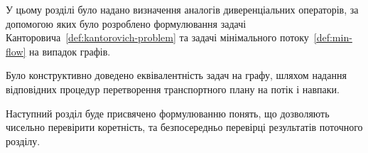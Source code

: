 \chapconclude{\ref{chap:graph}}
У цьому розділі було надано визначення аналогів диверенціальних операторів, за допомогою яких
було розроблено формулювання задачі Канторовича~\ref{def:kantorovich-problem}
та задачі мінімального потоку~\ref{def:min-flow} на випадок графів.

Було конструктивно доведено еквівалентність задач на графу, шляхом надання відповідних процедур перетворення
транспортного плану на потік і навпаки.

Наступний розділ буде присвячено формулюванню понять, що дозволяють чисельно перевірити коретність, та безпосередньо
перевірці результатів поточного розділу.